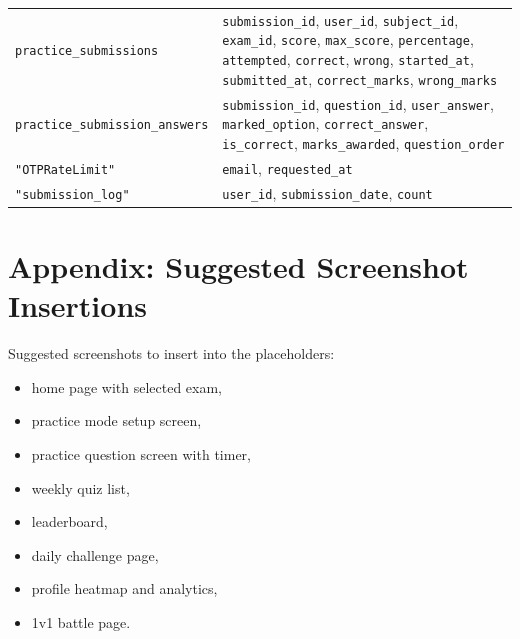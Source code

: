 \documentclass[12pt,a4paper]{article}
\begin{document}
\begin{longtable}{p{4cm}p{9cm}}
\texttt{practice\_submissions} & \texttt{submission\_id}, \texttt{user\_id}, \texttt{subject\_id}, \texttt{exam\_id}, \texttt{score}, \texttt{max\_score}, \texttt{percentage}, \texttt{attempted}, \texttt{correct}, \texttt{wrong}, \texttt{started\_at}, \texttt{submitted\_at}, \texttt{correct\_marks}, \texttt{wrong\_marks} \\
\texttt{practice\_submission\_answers} & \texttt{submission\_id}, \texttt{question\_id}, \texttt{user\_answer}, \texttt{marked\_option}, \texttt{correct\_answer}, \texttt{is\_correct}, \texttt{marks\_awarded}, \texttt{question\_order} \\
\texttt{"OTPRateLimit"} & \texttt{email}, \texttt{requested\_at} \\
\texttt{"submission\_log"} & \texttt{user\_id}, \texttt{submission\_date}, \texttt{count} \\
\bottomrule
\end{longtable}

\section{Appendix: Suggested Screenshot Insertions}
Suggested screenshots to insert into the placeholders:

\begin{itemize}[leftmargin=1.5em]
  \item home page with selected exam,
  \item practice mode setup screen,
  \item practice question screen with timer,
  \item weekly quiz list,
  \item leaderboard,
  \item daily challenge page,
  \item profile heatmap and analytics,
  \item 1v1 battle page.
\end{itemize}
\end{document}
